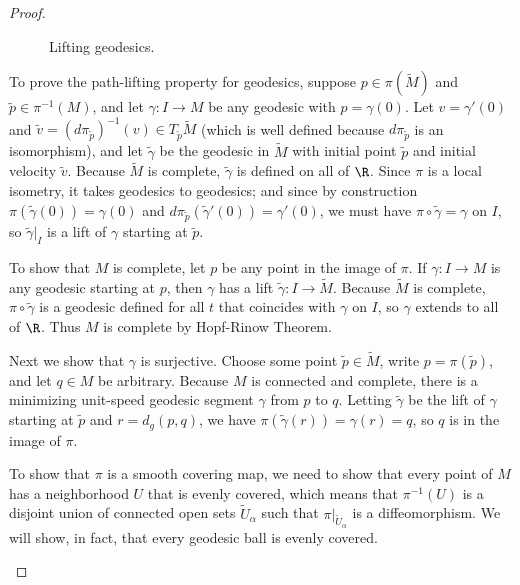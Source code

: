\begin{proof}
\begin{figure}[htbp]
\caption{Lifting geodesics.}
\end{figure}

To prove the path-lifting property for geodesics, suppose $p\in\pi(\widetilde{M})$ and $\tilde{p}\in\pi^{-1}(M)$, and let $\gamma:I\to M$ be any geodesic with $p=\gamma(0)$. Let $v=\gamma'(0)$ and $\tilde{v}=(d\pi_{\tilde{p}})^{-1}(v)\in T_{\tilde{p}}\widetilde{M}$ (which is well defined because $d\pi_{\tilde{p}}$ is an isomorphism), and let $\tilde{\gamma}$ be the geodesic in $\widetilde{M}$ with initial point $\tilde{p}$ and initial velocity $\tilde{v}$. Because $\widetilde{M}$ is complete, $\tilde{\gamma}$ is defined on all of $\R$. Since $\pi$ is a local isometry, it takes geodesics to geodesics; and since by construction $\pi(\tilde{\gamma}(0))=\gamma(0)$ and $d\pi_{\tilde{p}}(\tilde{\gamma}'(0))=\gamma'(0)$, we must have $\pi\circ\tilde{\gamma}=\gamma$ on $I$, so $\tilde{\gamma}|_I$ is a lift of $\gamma$ starting at $\tilde{p}$.\par
To show that $M$ is complete, let $p$ be any point in the image of $\pi$. If $\gamma:I\to M$ is any geodesic starting at $p$, then $\gamma$ has a lift $\tilde{\gamma}:I\to\widetilde{M}$. Because $\widetilde{M}$ is complete, $\pi\circ\tilde{\gamma}$ is a geodesic defined for all $t$ that coincides with $\gamma$ on $I$, so $\gamma$ extends to all of $\R$. 
Thus $M$ is complete by Hopf-Rinow Theorem.\par
Next we show that $\gamma$ is surjective. Choose some point $\tilde{p}\in\widetilde{M}$, write $p=\pi(\tilde{p})$, and let $q\in M$ be arbitrary. Because $M$ is connected and complete, there is a minimizing unit-speed geodesic segment $\gamma$ from $p$ to $q$. Letting $\tilde{\gamma}$ be the lift of $\gamma$ starting at $\tilde{p}$ and $r=d_g(p,q)$, we have $\pi(\tilde{\gamma}(r))=\gamma(r)=q$, so $q$ is in the image of $\pi$.\par
To show that $\pi$ is a smooth covering map, we need to show that every point of $M$ has a neighborhood $U$ that is evenly covered, which means that $\pi^{-1}(U)$ is a disjoint union of connected open sets $\widetilde{U}_\alpha$ such that $\pi|_{\widetilde{U}_\alpha}$ is a diffeomorphism. We will show, in fact, that every geodesic ball is evenly covered.
\begin{figure}[htbp]
\centering
\begin{minipage}[b]{200pt}
\centering

\end{minipage}
\end{figure}
\end{proof}
